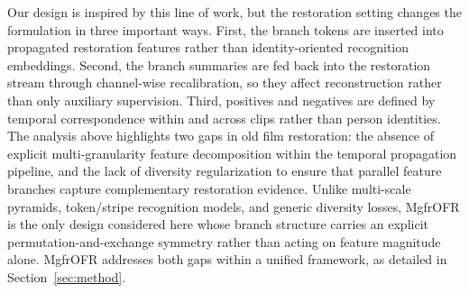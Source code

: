 Our design is inspired by this line of work, but the restoration setting changes the formulation in three important ways. First, the branch tokens are inserted into propagated restoration features rather than identity-oriented recognition embeddings. Second, the branch summaries are fed back into the restoration stream through channel-wise recalibration, so they affect reconstruction rather than only auxiliary supervision. Third, positives and negatives are defined by temporal correspondence within and across clips rather than person identities. The analysis above highlights two gaps in old film restoration: the absence of explicit multi-granularity feature decomposition within the temporal propagation pipeline, and the lack of diversity regularization to ensure that parallel feature branches capture complementary restoration evidence. Unlike multi-scale pyramids, token/stripe recognition models, and generic diversity losses, MgfrOFR is the only design considered here whose branch structure carries an explicit permutation-and-exchange symmetry rather than acting on feature magnitude alone. MgfrOFR addresses both gaps within a unified framework, as detailed in Section~\ref{sec:method}.
